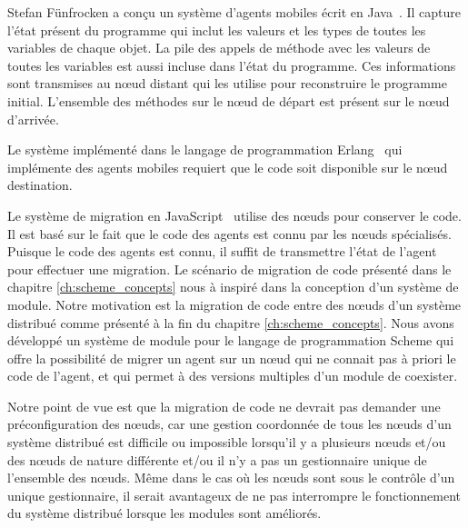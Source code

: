 Stefan Fünfrocken a conçu un système d'agents mobiles écrit en
Java~\cite{And98transparentmigration}. Il capture l'état présent du programme
qui inclut les valeurs et les types de toutes les variables de chaque objet.
La pile des appels de méthode avec les valeurs de toutes les variables est
aussi incluse dans l'état du programme.  Ces informations sont transmises au
nœud distant qui les utilise pour reconstruire le programme initial.
L'ensemble des méthodes sur le nœud de départ est présent sur le nœud
d'arrivée.

Le système implémenté dans le langage de programmation
Erlang~\cite{M_mobileintelligent} qui implémente des agents mobiles requiert
que le code soit disponible sur le nœud destination.

Le système de migration en JavaScript~\cite{DEV2017transparentmigration}
utilise des nœuds pour conserver le code. Il est basé sur le fait que le code
des agents est connu par les nœuds spécialisés. Puisque le code des agents est
connu, il suffit de transmettre l'état de l'agent pour effectuer une migration.
Le scénario de migration de code présenté dans le chapitre
\ref{ch:scheme_concepts} nous à inspiré dans la conception d'un système de
module.
Notre motivation est la migration de code entre des nœuds d'un système
distribué comme présenté à la fin du chapitre \ref{ch:scheme_concepts}.  Nous
avons développé un système de module pour le langage de programmation Scheme
qui offre la possibilité de migrer un agent sur un nœud qui ne connait pas à
priori le code de l'agent, et qui permet à des versions multiples d'un module
de coexister.

Notre point de vue est que la migration de code ne devrait pas
demander une préconfiguration des nœuds, car une gestion coordonnée de
tous les nœuds d'un système distribué est difficile ou impossible
lorsqu'il y a plusieurs nœuds et/ou des nœuds de nature différente
et/ou il n'y a pas un gestionnaire unique de l'ensemble des nœuds.
Même dans le cas où les nœuds sont sous le contrôle d'un unique
gestionnaire, il serait avantageux de ne pas interrompre le
fonctionnement du système distribué lorsque les modules sont
améliorés.



